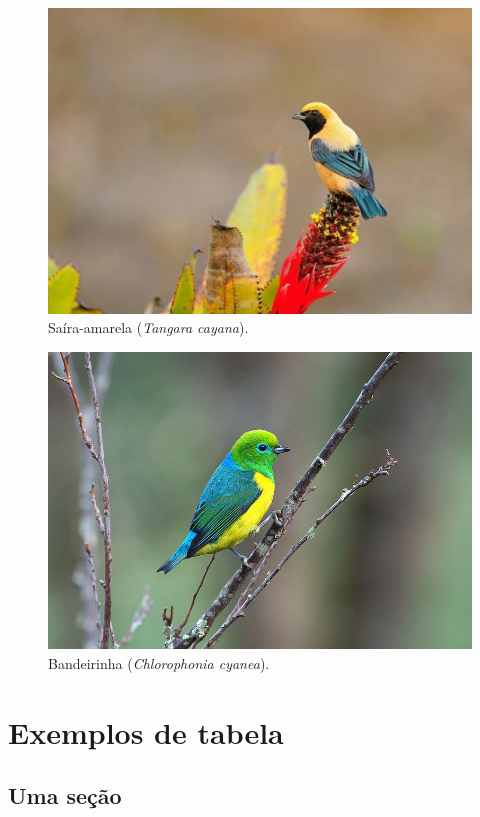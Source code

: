 \documentclass[
	10pt,				%
	openright,			%
	twoside,			%
	a5paper,			%
	english,			%
	french,				%
	spanish,			%
	brazil,				%
	sumario=tradicional
]{abntex2}
\begin{document}
\lipsum[6]

\begin{figure}
\centering
\includegraphics[width=0.6\linewidth]{./imagens/abntex2-modelo-livro-saira-amarela}
\caption{Saíra-amarela (\textit{Tangara cayana}).}
\label{fig:saira-amarela}
\end{figure}

\begin{figure}
\centering
\includegraphics[width=0.6\linewidth]{./imagens/abntex2-modelo-livro-bandeirinha}
\caption{Bandeirinha (\textit{Chlorophonia cyanea}).}
\label{fig:bandeirinha}
\end{figure}


\lipsum[7]

\chapter{Exemplos de tabela}

\section{Uma seção}

\lipsum[8]
\end{document}
